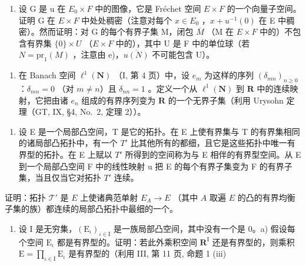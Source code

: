 \begin{enumerate}
\def\labelenumi{\alph{enumi})}
\setcounter{enumi}{5}
\tightlist
\item
  设 G 是 u 在 \(E_{0} \times F\) 中的图像，它是 Fréchet 空间 \(E \times F\) 的一个向量子空间。证明 G 在 \(E \times F\) 中处处稠密（注意对每个 \(x \in E_{0}\) ，\(x + u^{-1}(0)\) 在 E 中稠密）。然而证明：对 G 的每个有界子集 M，闭包 \(\overline{M}\) （M 在 \(E \times F\) 中的）不包含有界集 \(\{0\} \times U\) （\(E \times F\) 中的），其中 U 是 F 中的单位球（若 \(N = \text{pr}_{1}(M)\) ，注意由 e)，\(\overline{u(N)}\) 不可能包含 U）。
\end{enumerate}

\begin{enumerate}
\def\labelenumi{\arabic{enumi})}
\setcounter{enumi}{17}
\tightlist
\item
  在 Banach 空间 \(\ell^1 (\mathbf{N})\) （I, 第 4 页）中，设 \(e_m\) 为这样的序列 \((\delta_{mn})_{n\geq 0}\) ：\(\delta_{mn} = 0\) （对 \(m\neq n\)）且 \(\delta_{nn} = 1\) 。定义一个从 \(\ell^1 (\mathbf{N})\) 到 \(\mathbf{R}\) 中的连续映射，它把由诸 \(e_n\) 组成的有界序列变为 \(\mathbf{R}\) 的一个无界子集（利用 Urysohn 定理（GT, IX, §4, No.~2, 定理 2））。
\end{enumerate}

\exercisegroup

\begin{enumerate}
\def\labelenumi{\arabic{enumi})}
\tightlist
\item
  设 E 是一个局部凸空间，T 是它的拓扑。在 E 上使有界集与 T 的有界集相同的诸局部凸拓扑中，有一个 \(T'\) 比其他所有的都细，且它是这些拓扑中唯一有界型的拓扑。在 E 上赋以 \(T'\) 所得到的空间称为与 E 相伴的有界型空间。从 E 到一个局部凸空间 F 中的线性映射 u 把 E 的每个有界子集变为 F 的有界子集，当且仅当它对拓扑 \(T'\) 连续。
\end{enumerate}

证明：拓扑 \(\mathcal{T}'\) 是 \(E\) 上使诸典范单射 \(E_A \to E\) （其中 \(A\) 取遍 \(E\) 的凸的有界均衡子集的族）都连续的局部凸拓扑中最细的一个。

\begin{enumerate}
\def\labelenumi{\arabic{enumi})}
\setcounter{enumi}{1}
\tightlist
\item
  设 I 是无穷集，\((\mathrm{E}_{\iota})_{\iota \in \mathrm{I}}\) 是一族局部凸空间，其中没有一个是 0。a) 假设每个空间 \(\mathrm{E}_{\iota}\) 都是有界型的。证明：若此外乘积空间 \(\mathbf{R}^{\mathrm{I}}\) 还是有界型的，则乘积 \(\mathrm{E} = \prod_{\iota \in \mathrm{I}}\mathrm{E}_{\iota}\) 是有界型的（利用 III, 第 11 页, 命题 1 (iii)
\end{enumerate}


